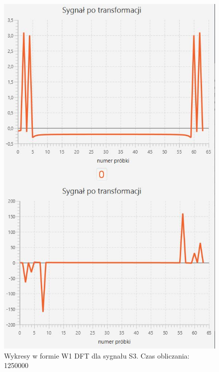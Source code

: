 \documentclass[12pt]{article}
\begin{document}
\begin{figure}[H]
	\centering
	\includegraphics[width=.8\linewidth]{DFT-S3-W1}
	\caption{Wykresy w formie W1 DFT dla sygnału S3. Czas obliczania: 1250000}
	\label{S3_sygnal}
\end{figure}
\end{document}
